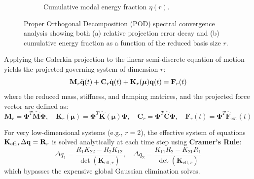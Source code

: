 \begin{figure}[htbp]
\begin{subfigure}{0.46\textwidth}
        \caption{Cumulative modal energy fraction $\eta(r)$.}
        \label{fig:pod_energy}
    \end{subfigure}
    \caption{Proper Orthogonal Decomposition (POD) spectral convergence analysis showing both (a) relative projection error decay and (b) cumulative energy fraction as a function of the reduced basis size $r$.}
    \label{fig:pod_energy_decay}
\end{figure}

Applying the Galerkin projection to the linear semi-discrete equation of motion yields the projected governing system of dimension $r$:
\begin{equation}
    \mathbf{M}_{r} \ddot{\mathbf{q}}(t) + \mathbf{C}_{r} \dot{\mathbf{q}}(t) + \mathbf{K}_{r}(\boldsymbol{\mu}) \mathbf{q}(t) = \mathbf{F}_{r}(t)
\end{equation}
where the reduced mass, stiffness, and damping matrices, and the projected force vector are defined as:
\begin{equation}
    \mathbf{M}_{r} = \boldsymbol{\Phi}^T \hat{\mathbf{M}} \boldsymbol{\Phi}, \quad \mathbf{K}_{r}(\boldsymbol{\mu}) = \boldsymbol{\Phi}^T \hat{\mathbf{K}}(\boldsymbol{\mu}) \boldsymbol{\Phi}, \quad \mathbf{C}_{r} = \boldsymbol{\Phi}^T \hat{\mathbf{C}} \boldsymbol{\Phi}, \quad \mathbf{F}_{r}(t) = \boldsymbol{\Phi}^T \hat{\mathbf{F}}_{\text{ext}}(t)
\end{equation}

For very low-dimensional systems (e.g., $r = 2$), the effective system of equations $\mathbf{K}_{\text{eff},r}\Delta \mathbf{q} = \mathbf{R}_r$ is solved analytically at each time step using \textbf{Cramer's Rule}:
\begin{equation}
    \Delta q_1 = \frac{R_1 K_{22} - R_2 K_{12}}{\det(\mathbf{K}_{\text{eff}, r})}, \quad \Delta q_2 = \frac{K_{11} R_2 - K_{21} R_1}{\det(\mathbf{K}_{\text{eff}, r})}
\end{equation}
which bypasses the expensive global Gaussian elimination solves.

